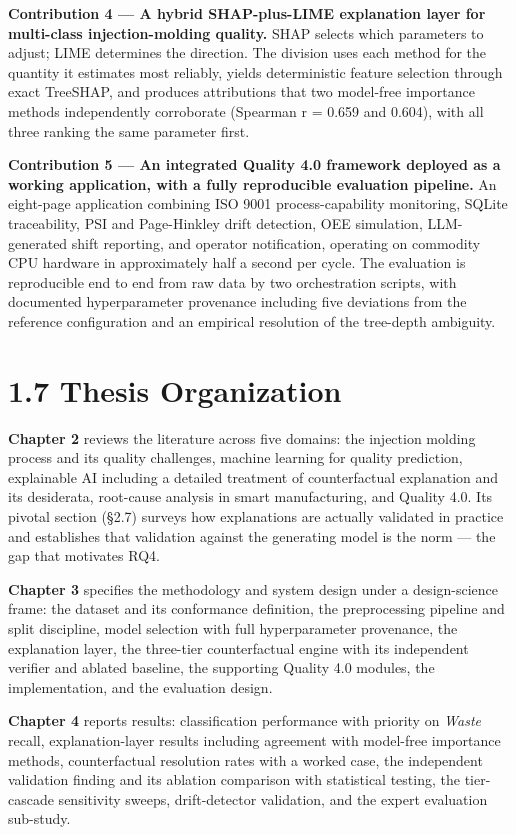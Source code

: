 \textbf{Contribution 4 --- A hybrid SHAP-plus-LIME explanation layer for multi-class injection-molding quality.} SHAP selects which parameters to adjust; LIME determines the direction. The division uses each method for the quantity it estimates most reliably, yields deterministic feature selection through exact TreeSHAP, and produces attributions that two model-free importance methods independently corroborate (Spearman r = 0.659 and 0.604), with all three ranking the same parameter first.

\textbf{Contribution 5 --- An integrated Quality 4.0 framework deployed as a working application, with a fully reproducible evaluation pipeline.} An eight-page application combining ISO 9001 process-capability monitoring, SQLite traceability, PSI and Page-Hinkley drift detection, OEE simulation, LLM-generated shift reporting, and operator notification, operating on commodity CPU hardware in approximately half a second per cycle. The evaluation is reproducible end to end from raw data by two orchestration scripts, with documented hyperparameter provenance including five deviations from the reference configuration and an empirical resolution of the tree-depth ambiguity.

\hypertarget{thesis-organization}{%
\section{1.7 Thesis Organization}\label{thesis-organization}}

\textbf{Chapter 2} reviews the literature across five domains: the injection molding process and its quality challenges, machine learning for quality prediction, explainable AI including a detailed treatment of counterfactual explanation and its desiderata, root-cause analysis in smart manufacturing, and Quality 4.0. Its pivotal section (§2.7) surveys how explanations are actually validated in practice and establishes that validation against the generating model is the norm --- the gap that motivates RQ4.

\textbf{Chapter 3} specifies the methodology and system design under a design-science frame: the dataset and its conformance definition, the preprocessing pipeline and split discipline, model selection with full hyperparameter provenance, the explanation layer, the three-tier counterfactual engine with its independent verifier and ablated baseline, the supporting Quality 4.0 modules, the implementation, and the evaluation design.

\textbf{Chapter 4} reports results: classification performance with priority on \emph{Waste} recall, explanation-layer results including agreement with model-free importance methods, counterfactual resolution rates with a worked case, the independent validation finding and its ablation comparison with statistical testing, the tier-cascade sensitivity sweeps, drift-detector validation, and the expert evaluation sub-study.

